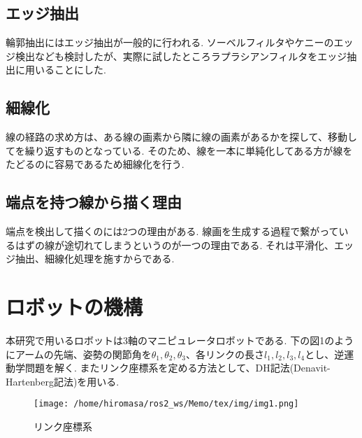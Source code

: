 \documentclass[a4j]{jarticle}			%
\begin{document}
\begin{multicols}{2}
\subsection{エッジ抽出}
輪郭抽出にはエッジ抽出が一般的に行われる.
ソーベルフィルタやケニーのエッジ検出なども検討したが、実際に試したところラプラシアンフィルタをエッジ抽出に用いることにした.


\subsection{細線化}
線の経路の求め方は、ある線の画素から隣に線の画素があるかを探して、移動してを繰り返すものとなっている.
そのため、線を一本に単純化してある方が線をたどるのに容易であるため細線化を行う.


\subsection{端点を持つ線から描く理由}
端点を検出して描くのには2つの理由がある.
線画を生成する過程で繋がっているはずの線が途切れてしまうというのが一つの理由である.
それは平滑化、エッジ抽出、細線化処理を施すからである.

\end{multicols}
\section{ロボットの機構}
本研究で用いるロボットは3軸のマニピュレータロボットである.
下の図1のようにアームの先端、姿勢の関節角を$\theta_1, \theta_2, \theta_3$、各リンクの長さ$l_1, l_2, l_3, l_4$とし、逆運動学問題を解く.
またリンク座標系を定める方法として、DH記法(Denavit-Hartenberg記法)を用いる.


\begin{figure}[htbp]
\begin{center}
\texttt{[image: /home/hiromasa/ros2\_ws/Memo/tex/img/img1.png]}
\caption{リンク座標系}
\end{center}
\end{figure}
\end{document}
